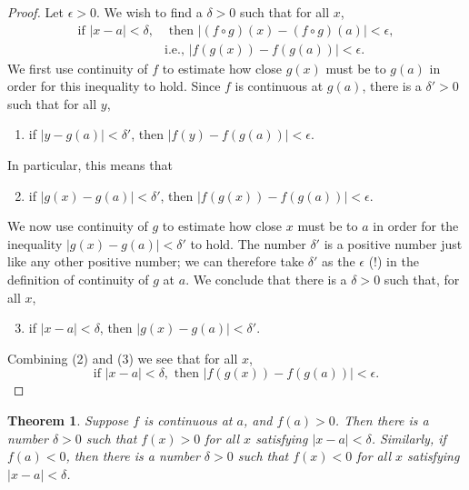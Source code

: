 \documentclass{article}
\newtheorem{theorem}{Theorem}
\begin{document}
\begin{proof}
  Let $\epsilon > 0$. We wish to find a $\delta > 0$ such that for all $x$,
  \begin{align*}
    \text{if } |x - a| < \delta, &\text{ then } |(f \circ g)(x) -
    (f \circ g)(a)| < \epsilon, \\
      &\text{i.e., } |f(g(x)) - f(g(a))| < \epsilon.
  \end{align*}
  We first use continuity of $f$ to estimate how close $g(x)$ must be to $g(a)$
  in order for this inequality to hold. Since $f$ is continuous at $g(a)$,
  there is a $\delta' > 0$ such that for all $y$, \begin{enumerate}
    \item if $|y - g(a)| < \delta'$, then $|f(y) - f(g(a))| < \epsilon$.
  \end{enumerate}
  In particular, this means that \begin{enumerate}
    \setcounter{enumi}{1}
    \item if $|g(x) - g(a)| < \delta'$, then $|f(g(x)) - f(g(a))| < \epsilon$.
  \end{enumerate}
  We now use continuity of $g$ to estimate how close $x$ must be to $a$ in
  order for the inequality $|g(x) - g(a)| < \delta'$ to hold. The number
  $\delta'$ is a positive number just like any other positive number; we can
  therefore take $\delta'$ as the $\epsilon$ (!) in the definition of
  continuity of $g$ at $a$. We conclude that there is a $\delta > 0$ such that,
  for all $x$, \begin{enumerate}
    \setcounter{enumi}{2}
    \item if $|x - a| < \delta$, then $|g(x) - g(a)| < \delta'$.
  \end{enumerate}
  Combining (2) and (3) we see that for all $x$, \begin{equation*}
    \text{if } |x - a| < \delta, \text{ then } |f(g(x)) - f(g(a))| < \epsilon.
  \end{equation*}
\end{proof}

\begin{theorem}
  Suppose $f$ is continuous at $a$, and $f(a) > 0$. Then there is a number
  $\delta > 0$ such that $f(x) > 0$ for all $x$ satisfying $|x - a| < \delta$.
  Similarly, if $f(a) < 0$, then there is a number $\delta > 0$ such that $f(x)
  < 0$ for all $x$ satisfying $|x - a| < \delta$.
\end{theorem}
\end{document}
